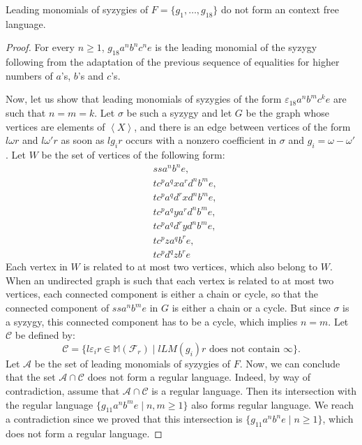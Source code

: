\documentclass[sigconf]{acmart}
\theoremstyle{plain}
\theoremstyle{definition}
\theoremstyle{remark}
\newcommand{\MM}{\mathbb M}
\newcommand{\LM}{LM}
\begin{document}
\begin{proposition}
  Leading monomials of syzygies of $F=\{g_1,\dots,g_{18}\}$ do not form an context free language.
  \label{prop:exp_pas_regulier}
\end{proposition}
\begin{proof}
  For every $n \geq 1$, $g_{18}a^nb^nc^ne$ is the leading monomial of the syzygy following from the adaptation
  of the previous sequence of equalities for higher numbers of $a$'s, $b$'s and $c$'s.
  
  Now, let us show that leading monomials of syzygies of the form $\varepsilon_{18}a^nb^mc^ke$ are such that $n = m=k$.
  Let $\sigma$ be such a syzygy and let $G$ be the graph whose vertices are elements of $\left\langle X \right\rangle$, and there is an edge between vertices of the form $l\omega r$ and $l\omega'r$ as soon as $lg_ir$ occurs with a nonzero coefficient in $\sigma$ and $g_i=\omega - \omega'$. Let $W$ be the set of vertices of the following form:
  \begin{align*}
    & ssa^nb^ne, \\
    & tc^pa^qxa^rd^nb^me, \\
    & tc^pa^qd^rxd^nb^me, \\
    & tc^pa^qya^rd^nb^me, \\
    & tc^pa^qd^ryd^nb^me, \\
    & tc^pza^qb^re, \\
    & tc^pd^qzb^re
  \end{align*}
  Each vertex in $W$ is related to at most two vertices, which also belong to $W$. When an undirected graph is such that each vertex is related to at most two vertices, each connected component is either a chain or cycle, so that the connected component of $ssa^nb^me$ in $G$ is either a chain or a cycle.
  But since $\sigma$ is a syzygy, this connected component has to be a cycle, which implies $n = m$.
  Let $\mathscr{C}$ be defined by:
$$\mathscr{C}=\{l\varepsilon_ir \in \MM(\mathscr{F}_r) \;|\; l \LM(g_i) r \mbox{ does not contain } \infty\}.$$
   Let $\mathscr{A}$ be the set of leading monomials of syzygies of $F$.
   Now, we can conclude that the set $\mathscr{A} \cap \mathscr{C}$ does not form a regular language.
  Indeed, by way of contradiction, assume that $\mathscr{A}\cap \mathscr{C}$ is a regular language. Then its
  intersection with the regular language $\{g_{11}a^nb^me \;|\; n, m \geq 1\}$ also forms regular language.
  We reach a contradiction since we proved that this intersection is $\{g_{11}a^nb^ne \;|\; n \geq 1 \}$, which does not form a regular language.
\end{proof}
\end{document}

